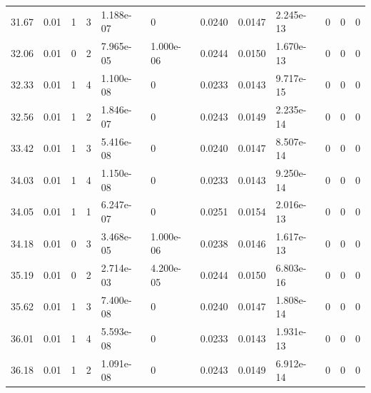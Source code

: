 \documentclass[preview]{standalone}
\begin{document}
{{{\begin{tabular}{L{1.2cm}C{1.2cm} C{0.3cm}C{0.5cm} C{1.4cm}C{1.4cm} C{1.4cm}C{1.4cm} C{1.6cm}C{1.6cm} C{1.6cm}C{1.6cm}}
  31.67  &  0.01  & 1     &  3 &  1.188e-07  & 0  &  0.0240&   0.0147& 2.245e-13 & 0   &  0 & 0  \\ 
  32.06  &  0.01  & 0     &  2 &  7.965e-05  & 1.000e-06  &  0.0244&   0.0150& 1.670e-13 & 0   &  0 & 0  \\ 
  32.33  &  0.01  & 1     &  4 &  1.100e-08  & 0  &  0.0233&   0.0143& 9.717e-15 & 0   &  0 & 0  \\ 
  32.56  &  0.01  & 1     &  2 &  1.846e-07  & 0  &  0.0243&   0.0149& 2.235e-14 & 0   &  0 & 0  \\ 
  33.42  &  0.01  & 1     &  3 &  5.416e-08  & 0  &  0.0240&   0.0147& 8.507e-14 & 0   &  0 & 0  \\ 
  34.03  &  0.01  & 1     &  4 &  1.150e-08  & 0  &  0.0233&   0.0143& 9.250e-14 & 0   &  0 & 0  \\ 
  34.05  &  0.01  & 1     &  1 &  6.247e-07  & 0  &  0.0251&   0.0154& 2.016e-13 & 0   &  0 & 0  \\ 
  34.18  &  0.01  & 0     &  3 &  3.468e-05  & 1.000e-06  &  0.0238&   0.0146& 1.617e-13 & 0   &  0 & 0  \\ 
  35.19  &  0.01  & 0     &  2 &  2.714e-03  & 4.200e-05  &  0.0244&   0.0150& 6.803e-16 & 0   &  0 & 0  \\ 
  35.62  &  0.01  & 1     &  3 &  7.400e-08  & 0  &  0.0240&   0.0147& 1.808e-14 & 0   &  0 & 0  \\ 
  36.01  &  0.01  & 1     &  4 &  5.593e-08  & 0  &  0.0233&   0.0143& 1.931e-13 & 0   &  0 & 0  \\ 
  36.18  &  0.01  & 1     &  2 &  1.091e-08  & 0  &  0.0243&   0.0149& 6.912e-14 & 0   &  0 & 0  \\ 
\hline 
\end{tabular} 

}}}
\end{document}
